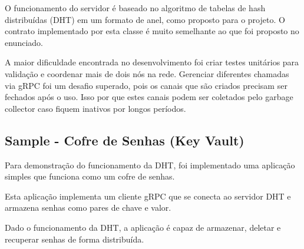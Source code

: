 \documentclass{article}
\begin{document}
    O funcionamento do servidor é baseado no algoritmo de tabelas de hash distribuídas (DHT) em um formato de anel, como proposto para o projeto.
    O contrato implementado por esta classe é muito semelhante ao que foi proposto no enunciado.

    A maior dificuldade encontrada no desenvolvimento foi criar testes unitários para validação e coordenar mais de dois nós na rede.
    Gerenciar diferentes chamadas via gRPC foi um desafio superado, pois os canais que são criados precisam ser fechados após o uso.
    Isso por que estes canais podem ser coletados pelo garbage collector caso fiquem inativos por longos períodos.

    \subsection{Sample - Cofre de Senhas (Key Vault)}\label{subsec:cliente}

    Para demonstração do funcionamento da DHT, foi implementado uma aplicação simples que funciona como um cofre de senhas.

    Esta aplicação implementa um cliente gRPC que se conecta ao servidor DHT e armazena senhas como pares de chave e valor.

    Dado o funcionamento da DHT, a aplicação é capaz de armazenar, deletar e recuperar senhas de forma distribuída.
\end{document}
